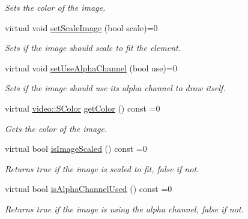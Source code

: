 \begin{DoxyCompactItemize}
\begin{DoxyCompactList}\small\item\em Sets the color of the image. \end{DoxyCompactList}\item 
\mbox{\label{classirr_1_1gui_1_1IGUIImage_a642c5683600be82efa0cc04b4236e34d}} 
virtual void \hyperlink{classirr_1_1gui_1_1IGUIImage_a642c5683600be82efa0cc04b4236e34d}{set\+Scale\+Image} (bool scale)=0
\begin{DoxyCompactList}\small\item\em Sets if the image should scale to fit the element. \end{DoxyCompactList}\item 
\mbox{\label{classirr_1_1gui_1_1IGUIImage_a9426b40769f4ef7614e6a94dcfa67455}} 
virtual void \hyperlink{classirr_1_1gui_1_1IGUIImage_a9426b40769f4ef7614e6a94dcfa67455}{set\+Use\+Alpha\+Channel} (bool use)=0
\begin{DoxyCompactList}\small\item\em Sets if the image should use its alpha channel to draw itself. \end{DoxyCompactList}\item 
\mbox{\label{classirr_1_1gui_1_1IGUIImage_a46a6dc23dd045cb65247344bf71078e4}} 
virtual \hyperlink{classirr_1_1video_1_1SColor}{video\+::\+S\+Color} \hyperlink{classirr_1_1gui_1_1IGUIImage_a46a6dc23dd045cb65247344bf71078e4}{get\+Color} () const =0
\begin{DoxyCompactList}\small\item\em Gets the color of the image. \end{DoxyCompactList}\item 
\mbox{\label{classirr_1_1gui_1_1IGUIImage_aca24045ee740242b9c8de73a8f609a27}} 
virtual bool \hyperlink{classirr_1_1gui_1_1IGUIImage_aca24045ee740242b9c8de73a8f609a27}{is\+Image\+Scaled} () const =0
\begin{DoxyCompactList}\small\item\em Returns true if the image is scaled to fit, false if not. \end{DoxyCompactList}\item 
\mbox{\label{classirr_1_1gui_1_1IGUIImage_a5be6faec4c156fc955c84a5b3f703d63}} 
virtual bool \hyperlink{classirr_1_1gui_1_1IGUIImage_a5be6faec4c156fc955c84a5b3f703d63}{is\+Alpha\+Channel\+Used} () const =0
\begin{DoxyCompactList}\small\item\em Returns true if the image is using the alpha channel, false if not. \end{DoxyCompactList}\end{DoxyCompactItemize}
